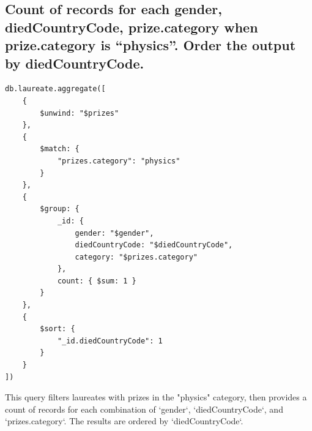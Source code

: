 \documentclass{article}
\begin{document}
\subsection{Count of records for each gender, diedCountryCode, prize.category when prize.category is “physics”. Order the output by diedCountryCode.}
\begin{lstlisting}
db.laureate.aggregate([
    {
        $unwind: "$prizes"
    },
    {
        $match: {
            "prizes.category": "physics"
        }
    },
    {
        $group: {
            _id: {
                gender: "$gender",
                diedCountryCode: "$diedCountryCode",
                category: "$prizes.category"
            },
            count: { $sum: 1 }
        }
    },
    {
        $sort: {
            "_id.diedCountryCode": 1
        }
    }
])
\end{lstlisting}
This query filters laureates with prizes in the "physics" category, then provides a count of records for each combination of `gender`, `diedCountryCode`, and `prizes.category`. The results are ordered by `diedCountryCode`.
\end{document}
